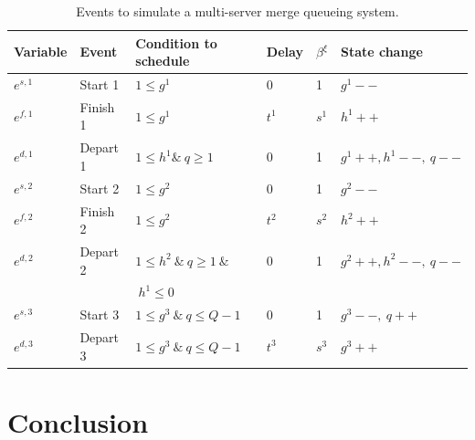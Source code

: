 \documentclass[]{interact}
\theoremstyle{plain}%
\theoremstyle{definition}
\theoremstyle{remark}
\begin{document}
\begin{table}[h]
	\begin{tabular}{|llllll|}\hline
		Variable&Event & Condition to schedule & Delay&$\beta^{\xi}$& State change\\\hline
		$e^{s,1}$&Start 1 	& $1\le g^1$ & $0$&1& $g^1--$ \\\hline
		$e^{f,1}$&Finish 1 & $1\le g^1$ 	& $t^1$ &$s^1$& $h^1++$\\\hline 
		$e^{d,1}$&Depart 1& $1\le h^1 \&\  q\ge 1$&$0$ &1 & $g^1++,h^1--,\ q--$\\\hline
		$e^{s,2}$&Start 2 	& $1\le g^2$ & $0$ &1& $g^2--$ \\	\hline
		$e^{f,2}$&Finish 2 & $1\le g^2$ 	& $t^2$ &$s^2$ & $h^2++$\\\hline
		$e^{d,2}$&Depart 2& $1\le h^2\ \&\ q\ge 1\ \&$&$0$  &1&  $g^2++,h^2--,\ q--$\\
		&&$\ h^1\le 0 $ & &&\\\hline
		$e^{s,3}$& Start 3 & $1\le g^3\ \&\ q\le Q-1$&$0$  &1& $g^3--,\ q++$\\\hline
		$e^{d,3}$& Depart 3 & $1\le g^3\ \&\ q\le Q-1$ & $t^3$  &$s^3$& $g^3++$\\\hline
	\end{tabular}
	\caption{Events to simulate a multi-server merge queueing system.}
	\label{tab:multimerge}
\end{table}

\section{Conclusion}






\end{document}
